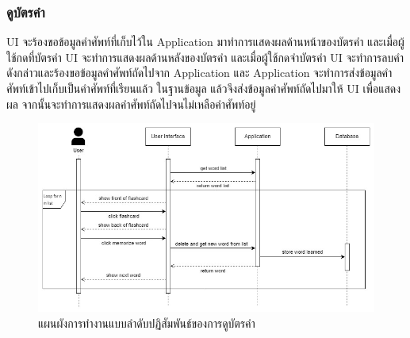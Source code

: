 \documentclass[12pt,oneside,openright,a4paper]{cpe-thai-project}
\begin{document}
\pagebreak
\subsubsection{ดูบัตรคำ}
\hspace{1cm}
UI จะร้องขอข้อมูลคำศัพท์ที่เก็บไว้ใน Application มาทำการแสดงผลด้านหน้าของบัตรคำ และเมื่อผู้ใช้กดที่บัตรคำ UI จะทำการแสดงผลด้านหลังของบัตรคำ
และเมื่อผู้ใช้กดจำบัตรคำ UI จะทำการลบคำดังกล่าวและร้องขอข้อมูลคำศัพท์ถัดไปจาก Application และ Application จะทำการส่งข้อมูลคำศัพท์เข้าไปเก็บเป็นคำศัพท์ที่เรียนแล้ว
ในฐานข้อมูล แล้วจึงส่งข้อมูลคำศัพท์ถัดไปมาให้ UI เพื่อแสดงผล จากนั้นจะทำการแสดงผลคำศัพท์ถัดไปจนไม่เหลือคำศัพท์อยู่
\begin{figure}[!h]\centering
	\includegraphics[width=\textwidth, keepaspectratio=true]{image/chap3/sequence/Flashcard.jpg}
	\caption{แผนผังการทำงานแบบลำดับปฏิสัมพันธ์ของการดูบัตรคำ}\label{fig:S_Flashcard}
\end{figure}

\pagebreak
\end{document}
